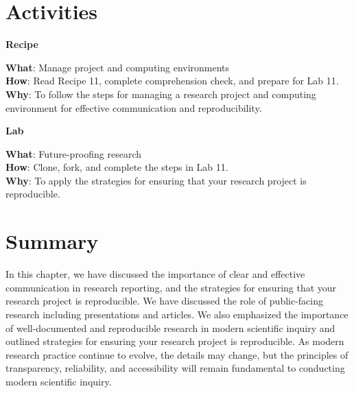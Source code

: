 \documentclass[
  letterpaper,
]{latex/krantz}
\theoremstyle{definition}
\theoremstyle{remark}
\begin{document}
\section*{Activities}\label{activities-9}


\begin{tcolorbox}[enhanced jigsaw, colframe=quarto-callout-color-frame, breakable, bottomrule=.15mm, arc=.35mm, left=2mm, opacityback=0, rightrule=.15mm, colback=white, toprule=.15mm, leftrule=.75mm]

\textbf{ Recipe}

\textbf{What}: Manage project and computing environments\\
\textbf{How}: Read Recipe 11, complete comprehension check, and prepare
for Lab 11.\\
\textbf{Why}: To follow the steps for managing a research project and
computing environment for effective communication and reproducibility.

\end{tcolorbox}

\begin{tcolorbox}[enhanced jigsaw, colframe=quarto-callout-color-frame, breakable, bottomrule=.15mm, arc=.35mm, left=2mm, opacityback=0, rightrule=.15mm, colback=white, toprule=.15mm, leftrule=.75mm]

\textbf{ Lab}

\textbf{What}: Future-proofing research\\
\textbf{How}: Clone, fork, and complete the steps in Lab 11.\\
\textbf{Why}: To apply the strategies for ensuring that your research
project is reproducible.

\end{tcolorbox}

\section*{Summary}\label{summary-10}


In this chapter, we have discussed the importance of clear and effective
communication in research reporting, and the strategies for ensuring
that your research project is reproducible. We have discussed the role
of public-facing research including presentations and articles. We also
emphasized the importance of well-documented and reproducible research
in modern scientific inquiry and outlined strategies for ensuring your
research project is reproducible. As modern research practice continue
to evolve, the details may change, but the principles of transparency,
reliability, and accessibility will remain fundamental to conducting
modern scientific inquiry.
\end{document}
